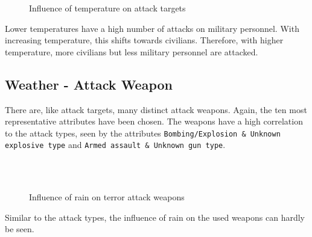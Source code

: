\newpage

\begin{figure}[!ht]
\centering
    \qquad
    \qquad
    \qquad
    \qquad
    \qquad
\caption{Influence of temperature on attack targets}
\label{fig:example subfigure}
\end{figure}

Lower temperatures have a high number of attacks on military personnel. With increasing temperature, this shifts towards civilians. Therefore, with higher temperature, more civilians but less military personnel are attacked. 

\newpage

\subsection{Weather - Attack Weapon}
There are, like attack targets, many distinct attack weapons. Again, the ten most representative attributes have been chosen. The weapons have a high correlation to the attack types, seen by the attributes \texttt{Bombing/Explosion \& Unknown explosive type} and \texttt{Armed assault \& Unknown gun type}.

\begin{figure}[!ht]
\centering
    \qquad\\
    \qquad
    \qquad\\
    \qquad
\caption{Influence of rain on terror attack weapons}
\end{figure}

Similar to the attack types, the influence of rain  on the used weapons can hardly be seen.

